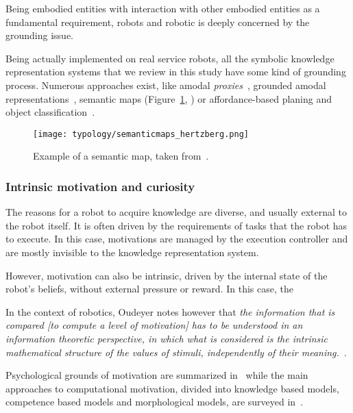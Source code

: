 Being embodied entities with interaction with other embodied entities as a
fundamental requirement, robots and robotic is deeply concerned by the
grounding issue.

Being actually implemented on real service robots, all the symbolic knowledge
representation systems that we review in this study have some kind of grounding
process. Numerous approaches exist, like amodal
\emph{proxies}~\cite{Jacobsson2008}, grounded amodal
representations~\cite{Alami2011, Mavridis2006}, semantic maps
(Figure~\ref{fig|semanticmap}, \cite{Nuechter2008, Galindo2008,Blodow2011}) or
affordance-based planing and object classification~\cite{Lorken2008,
Varadarajan2011}.


\begin{figure}
    \centering
    \texttt{[image: typology/semanticmaps\_hertzberg.png]}
    \caption{Example of a semantic map, taken from~\cite{Nuechter2008}.}
    \label{fig|semanticmap}
\end{figure}

\subsubsection{Intrinsic motivation and curiosity}

The reasons for a robot to acquire knowledge are diverse, and usually external
to the robot itself. It is often driven by the requirements of tasks that the
robot has to execute. In this case, motivations are managed by the execution
controller and are mostly invisible to the knowledge representation system.

However, motivation can also be intrinsic, driven by the internal state of the
robot's beliefs, without external pressure or reward. In this case, the 

In the context of robotics, Oudeyer notes however that \emph{the information that is
compared \emph{[to compute a level of motivation]} has to be understood in an
information theoretic perspective, in which what is considered is the intrinsic
mathematical structure of the values of stimuli, independently of their
meaning.}~\cite{Oudeyer2007}.

Psychological grounds of motivation are summarized in~\cite{Oudeyer2007} while
the main approaches to computational motivation, divided into knowledge based
models, competence based models and morphological models, are surveyed
in~\cite{Oudeyer2008}.

